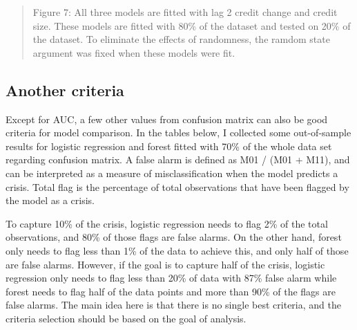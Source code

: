 \documentclass{article}
\newcommand{\ciapdf}[1]{\vspace*{-\parskip}\begin{center}\resizebox{0.75\textwidth}{!}{\texttt{[image: \#1]}}\end{center}}
\begin{document}
\ciapdf{Figure_11.pdf}
\begin{quote}
Figure 7: All three models are fitted with lag 2 credit change and
credit size. These models are fitted with 80\% of the dataset and
tested on 20\% of the dataset. To eliminate the effects of randomness, the
ramdom state argument was fixed when these models were fit.
\end{quote}

\subsection*{Another criteria}

Except for AUC, a few other values from confusion matrix can also be good
criteria for model comparison. In the tables below, I collected some
out-of-sample results for logistic regression and forest fitted with 70\% of
the whole data set regarding confusion matrix. A false alarm is defined as
M01 / (M01 + M11), and can be interpreted as a measure of misclassification
when the model predicts a crisis. Total flag is the percentage of total
observations that have been flagged by the model as a crisis.

To capture 10\% of the crisis,
logistic regression needs to flag 2\% of the total observations, and 80\%
of those flags are false alarms. On the other hand, forest only needs to flag
less than 1\% of the data to achieve this, and only half of those are false alarms. However,
if the goal is to capture half of the crisis, logistic regression only
needs to flag less than 20\% of data with 87\% false alarm while forest
needs to flag half of the data points and more than 90\% of the flags are
false alarms. The main idea here is that there is no single best criteria,
and the criteria selection should be based on the goal of analysis.
\end{document}
